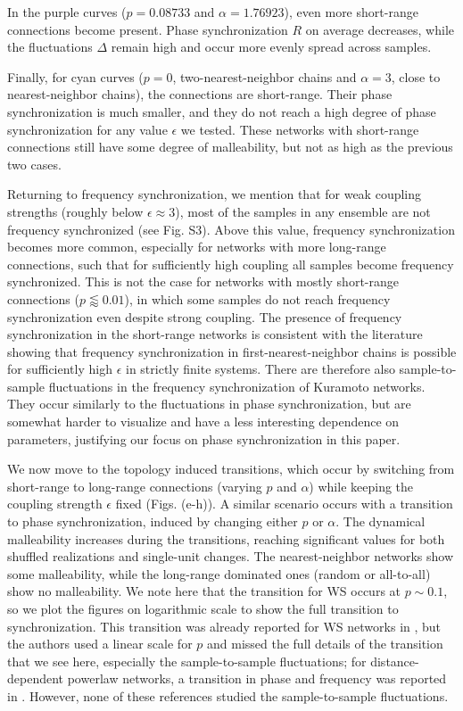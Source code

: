 In the purple curves ($p = 0.08733$ and $\alpha=1.76923$), even more short-range connections become present. Phase synchronization $R$ on average decreases, while the fluctuations $\Delta$ remain high and occur more evenly spread across samples.

Finally, for cyan curves ($p = 0$, two-nearest-neighbor chains and $\alpha = 3$, close to nearest-neighbor chains), the connections are short-range. Their phase synchronization is much smaller, and they do not reach a high degree of phase synchronization for any value $\epsilon$ we tested.
These networks with short-range connections still have some degree of malleability, but not as high as the previous two cases. 

Returning to frequency synchronization, we mention that for weak coupling strengths (roughly below $\epsilon \approx 3$), most of the samples in any ensemble are not frequency synchronized (see Fig. S3). Above this value, frequency synchronization becomes more common, especially for networks with more long-range connections, such that for sufficiently high coupling all samples become frequency synchronized. This is not the case for networks with mostly short-range connections ($p \lessapprox 0.01$), in which some samples do not reach frequency synchronization even despite strong coupling. The presence of frequency synchronization in the short-range networks is consistent with the literature \cite{strogatz1988phase, acebron2005kuramoto} showing that frequency synchronization in first-nearest-neighbor chains is possible for sufficiently high $\epsilon$ in strictly finite systems. There are therefore also sample-to-sample fluctuations in the frequency synchronization of Kuramoto networks. They occur similarly to the fluctuations in phase synchronization, but are somewhat harder to visualize and have a less interesting dependence on parameters, justifying our focus on phase synchronization in this paper.

We now move to the topology induced transitions, which occur by switching from short-range to long-range connections (varying $p$ and $\alpha$) while keeping the coupling strength $\epsilon$ fixed (Figs. (e-h)). A similar scenario occurs with a transition to phase synchronization, induced by changing either $p$ or $\alpha$. The dynamical malleability increases during the transitions, reaching significant values for both shuffled realizations and single-unit changes. The nearest-neighbor networks show some malleability, while the long-range dominated ones (random or all-to-all) show no malleability. We note here that the transition for WS occurs at $p \sim 0.1$, so we plot the figures on logarithmic scale to show the full transition to synchronization. This transition was already reported for WS networks in \cite{hong2002synchronization}, but the authors used a linear scale for $p$ and missed the full details of the transition that we see here, especially the sample-to-sample fluctuations; for distance-dependent powerlaw networks, a transition in phase and frequency was reported in \cite{rogers1996phasetransitions}. However, none of these references studied the sample-to-sample fluctuations.

